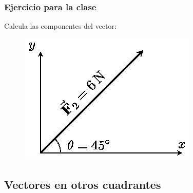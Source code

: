 \documentclass[14pt]{beamer}
\begin{document}
\begin{frame}
\frametitle{Ejercicio para la clase}
Calcula las componentes del vector:
\begin{figure}
    \centering
    \includegraphics[scale=1.3]{Imagenes/Componentes_Vector_05.eps}
\end{figure}
\end{frame}

\subsection{Vectores en otros cuadrantes}
\end{document}
